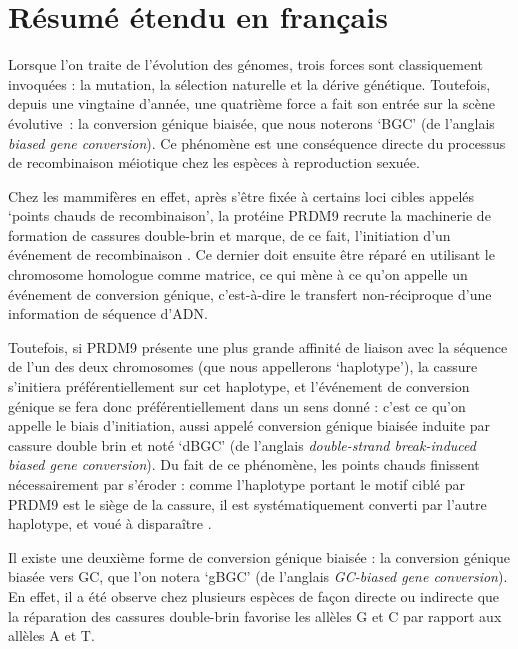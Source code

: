 \section*{Résumé étendu en français}

{

Lorsque l'on traite de l'évolution des génomes, trois forces sont classiquement invoquées : la mutation, la sélection naturelle et la dérive génétique.
%
Toutefois, depuis une vingtaine d'année, une quatrième force a fait son entrée sur la scène évolutive~: la conversion génique biaisée, que nous noterons ‘BGC’ (de l'anglais \textit{biased gene conversion}).
Ce phénomène est une conséquence directe du processus de recombinaison méiotique chez les espèces à reproduction sexuée.

Chez les mammifères en effet, après s'être fixée à certains loci cibles appelés ‘points chauds de recombinaison’, la protéine PRDM9 recrute la machinerie de formation de cassures double-brin et marque, de ce fait, l'initiation d'un événement de recombinaison \citep{baudat2010prdm9,myers2010drive,parvanov2010prdm9}.
Ce dernier doit ensuite être réparé en utilisant le chromosome homologue comme matrice, ce qui mène à ce qu'on appelle un événement de conversion génique, c'est-à-dire le transfert non-réciproque d'une information de séquence d'ADN\@.

Toutefois, si PRDM9 présente une plus grande affinité de liaison avec la séquence de l'un des deux chromosomes (que nous appellerons ‘haplotype’), la cassure s'initiera préférentiellement sur cet haplotype, et l'événement de conversion génique se fera donc préférentiellement dans un sens donné : c'est ce qu'on appelle le biais d'initiation, aussi appelé conversion génique biaisée induite par cassure double brin et noté ‘dBGC’ (de l'anglais \textit{double-strand break-induced biased gene conversion}).
Du fait de ce phénomène, les points chauds finissent nécessairement par s'éroder : comme l'haplotype portant le motif ciblé par PRDM9 est le siège de la cassure, il est systématiquement converti par l'autre haplotype, et voué à dispara\^itre \citep{boulton1997hotspot}.

Il existe une deuxième forme de conversion génique biaisée : la conversion génique biasée vers GC, que l'on notera ‘gBGC’ (de l'anglais \textit{GC-biased gene conversion}).
En effet, il a été observe chez plusieurs espèces 
de façon directe \citep{mancera2008highresolution, si2015widely, williams2015noncrossover, halldorsson2016rate, keith2016high, smeds2016highresolution}
ou indirecte \citep{escobar2011gcbiased,pessia2012evidence,figuet2014biased}
que la réparation des cassures double-brin favorise les allèles G et C par rapport aux allèles A et T\@.\\


}

